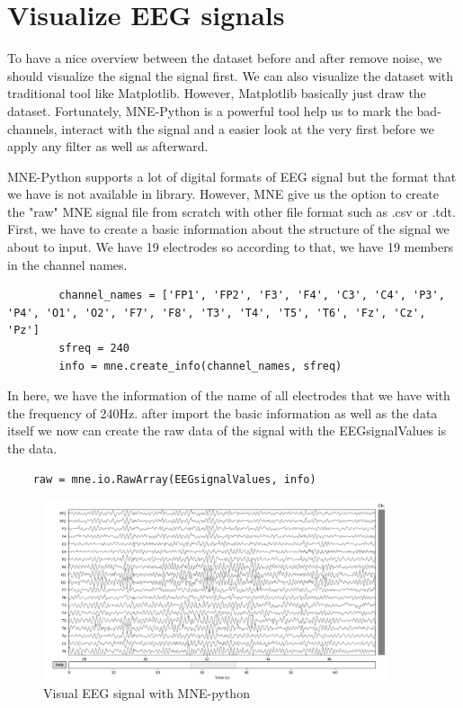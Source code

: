 \section{Visualize EEG signals}
    To have a nice overview between the dataset before and after remove noise, we should visualize the signal the signal first. We can also visualize the dataset with traditional tool like Matplotlib. However, Matplotlib basically just draw the dataset. Fortunately, MNE-Python is a powerful tool help us to mark the bad-channels, interact with the signal and a easier look at the very first before we apply any filter as well as afterward. 
    
    MNE-Python supports a lot of digital formats of EEG signal but the format that we have is not available in library. However, MNE give us the option to create the "raw" MNE signal file from scratch with other file format such as .csv or .tdt. First, we have to create a basic information about the structure of the signal we about to input. We have 19 electrodes so according to that, we have 19 members in the channel names.
    
    \begin{lstlisting}
        channel_names = ['FP1', 'FP2', 'F3', 'F4', 'C3', 'C4', 'P3', 'P4', 'O1', 'O2', 'F7', 'F8', 'T3', 'T4', 'T5', 'T6', 'Fz', 'Cz', 'Pz']
        sfreq = 240
        info = mne.create_info(channel_names, sfreq) 
    \end{lstlisting}
    
    In here, we have the information of the name of all electrodes that we have with the frequency of 240Hz. after import the basic information as well as the data itself we now can create the raw data of the signal with the EEGsignalValues is the data.
    
    \begin{lstlisting}
    raw = mne.io.RawArray(EEGsignalValues, info)
    \end{lstlisting}
    
    \begin{figure}
    \centering
    \includegraphics[width = 0.9\textwidth]{images/EEG_with_MNE.png}
    \caption{Visual EEG signal with MNE-python}
    \label{fig:visualEEGwithMNE}
    \end{figure}
    
